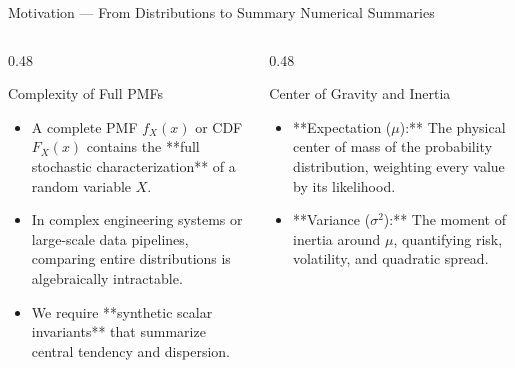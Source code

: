 \documentclass[aspectratio=169,xcolor={dvipsnames,table}]{beamer}
\begin{document}
\begin{frame}{Motivation --- From Distributions to Summary Numerical Summaries}
	\begin{columns}[T]
		\begin{column}{0.48\textwidth}
			\begin{block}{Complexity of Full PMFs}
				\small
				\begin{itemize}
					\itemsep=0.08cm
					\item A complete PMF $f_X(x)$ or CDF $F_X(x)$ contains the **full stochastic characterization** of a random variable $X$.
					\item In complex engineering systems or large-scale data pipelines, comparing entire distributions is algebraically intractable.
					\item We require **synthetic scalar invariants** that summarize central tendency and dispersion.
				\end{itemize}
			\end{block}
		\end{column}
		\begin{column}{0.48\textwidth}
			\begin{alertblock}{Center of Gravity and Inertia}
				\small
				\begin{itemize}
					\itemsep=0.08cm
					\item **Expectation ($\mu$):** The physical center of mass of the probability distribution, weighting every value by its likelihood.
					\item **Variance ($\sigma^2$):** The moment of inertia around $\mu$, quantifying risk, volatility, and quadratic spread.
				\end{itemize}
			\end{alertblock}
		\end{column}
	\end{columns}
\end{frame}
\end{document}
